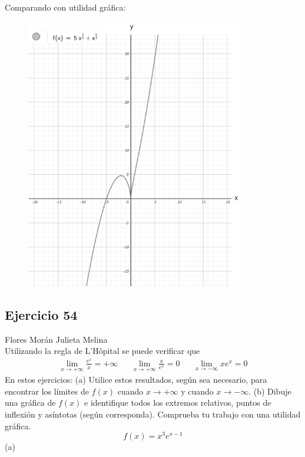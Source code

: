\documentclass[12pt]{article}
\begin{document}
Comparando con utilidad gráfica:
\begin{figure}[H]
\centering
\includegraphics[width=0.85\textwidth]{../img/img_Lista3/p3_36.png}
\end{figure}



\subsection{Ejercicio 54} Flores Morán Julieta Melina \\

Utilizando la regla de L'Hôpital se puede verificar que
\begin{align*}
  \lim_{x \to +\infty} \frac{e^x}{x}=+\infty && \lim_{x \to +\infty} \frac{x}{e^x}=0 && \lim_{x \to -\infty} xe^x=0
\end{align*}
En estos ejercicios: (a) Utilice estos resultados, según sea necesario, para encontrar los límites de $f(x)$ cuando $x\rightarrow +\infty$ y cuando $x\rightarrow -\infty$. (b) Dibuje una gráfica de $f(x)$ e identifique todos los extremos relativos, puntos de inflexión y asíntotas (según corresponda). Comprueba tu trabajo con una utilidad gráfica.
\[
f(x)=x^3e^{x-1}
\]
(a)\\
\end{document}
